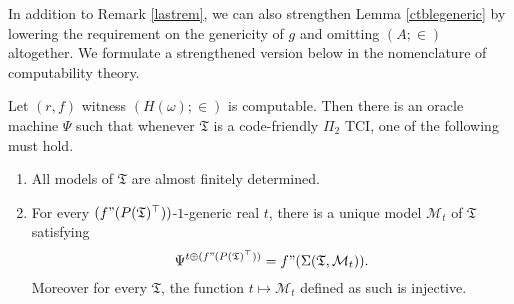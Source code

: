 \documentclass[12pt]{article}
\numberwithin{equation}{section}
\begin{document}
In addition to Remark \ref{lastrem}, we can also strengthen Lemma \ref{ctblegeneric} by lowering the requirement on the genericity of $g$ and omitting $(A; \in)$ altogether. We formulate a strengthened version below in the nomenclature of computability theory.

\begin{lem}\label{ctblegeneric2}
Let $(r, f)$ witness $(H(\omega); \in)$ is computable. Then there is an oracle machine $\Psi$ such that whenever $\mathfrak{T}$ is a code-friendly $\Pi_2$ TCI, one of the following must hold.
\begin{enumerate}[label=(\arabic*)]
    \item All models of $\mathfrak{T}$ are almost finitely determined.
    \item\label{4532} For every $(f" (P(\mathfrak{T})^{\top}))$-$1$-generic real $t$, there is a unique model $\mathcal{M}_t$ of $\mathfrak{T}$ satisfying $$\Psi^{t \oplus (f" (P(\mathfrak{T})^{\top}))} = f" (\Sigma(\mathfrak{T}, \mathcal{M}_t)).$$ Moreover for every $\mathfrak{T}$, the function $t \mapsto \mathcal{M}_t$ defined as such is injective.
\end{enumerate}
\end{lem}
\end{document}
